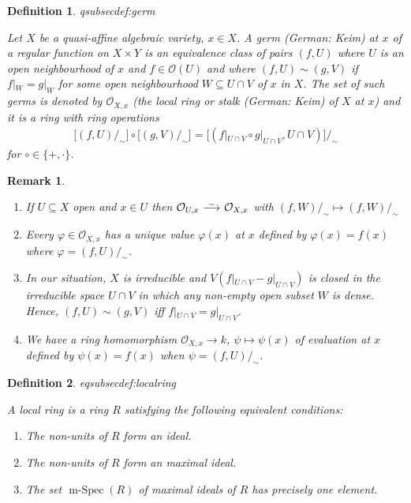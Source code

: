 \documentclass[DIV=14,parskip=full,pointednumbers]{scrartcl}
\renewcommand{\phi}{\varphi}
\newenvironment{alphanumerate}{\begin{enumerate}[label={$(\alph*)$},ref=\curthm]}{\end{enumerate}}
\theoremstyle{cthm}
\theoremstyle{cvarthm}
\theoremstyle{cdef}
\newtheorem{defi}{Definition}[subsection]
\newtheorem{rem}{Remark}[subsection]
\newcommand{\lbl}[1]{
	\label{#1}
	\ifmmode
	\expandafter\xdef\csname eqsubsec#1\endcsname{\thesubsection}
	\fi
}
\newcommand{\Oo}{\mathcal{O}}
\newcommand{\isomorphism}{
	\tikz[baseline=(a.base)] \node (a) at (0,0) {$\longrightarrow$} node[above=-0.25ex] {\tiny $\sim$};}
\renewcommand{\phi}{\varphi}
\begin{document}
	\begin{defi}\lbl{def:germ}
		Let $X$ be a quasi-affine algebraic variety, $x\in X$. A \emph{germ} (German: \emph{Keim}) at $x$ of a regular function on $X\times Y$ is an equivalence class of pairs $(f,U)$ where $U$ is an open neighbourhood of $x$ and $f\in\Oo(U)$ and where $(f,U)\sim (g,V)$ if $f|_W = g|_W$ for some open neighbourhood $W\subseteq U\cap V$ of $x$ in $X$. The set of such germs is denoted by $\Oo_{X,x}$ (the \emph{local ring} or \emph{stalk} (German: \emph{Keim}) of $X$ at $x$) and it is a ring with ring operations
		\begin{align*}
			\big[(f,U)/_\sim\big] \circ \big[(g,V)/_\sim\big] = \big[(f|_{U\cap V} \circ g|_{U\cap V}, U\cap V)\big]/_\sim
		\end{align*}
		for $\circ\in\{+,\cdot\}$.
	\end{defi}
	\begin{rem}
	\begin{alphanumerate}
	\item 
		If $U\subseteq X$ open and $x\in U$ then $\Oo_{U,x} \isomorphism \Oo_{X,x}$ with $(f,W)/_\sim \mapsto (f,W)/_\sim$
	\item 
		Every $\phi\in \Oo_{X,x}$ has a unique value $\phi(x)$ at $x$ defined by $\phi(x) = f(x)$ where $\phi=(f,U)/_\sim$.
	\item 
		In our situation, $X$ is irreducible and $V(f|_{U\cap V} -g|_{U\cap V})$ is closed in the irreducible space $U\cap V$ in which any non-empty open subset $W$ is dense. Hence, $(f,U)\sim (g,V)$ iff $f|_{U\cap V} = g|_{U\cap V}$.
	\item 
		We have a ring homomorphism $\Oo_{X,x}\to k$, $\psi \mapsto \psi(x)$ of evaluation at $x$ defined by $\psi (x) = f(x)$ when $\psi = (f,U)/_\sim$.
	\end{alphanumerate}
 
	\end{rem}
	\begin{defi}\lbl{def:localring}
		A \emph{local ring} is a ring $R$ satisfying the following equivalent conditions:
		\begin{alphanumerate}
		\item 
			The non-units of $R$ form an ideal.
		\item 
			The non-units of $R$ form an maximal ideal.
		\item 
			The set $\operatorname{m-Spec}(R)$ of maximal ideals of $R$ has precisely one element.
		\end{alphanumerate}
	\end{defi}
\end{document}
